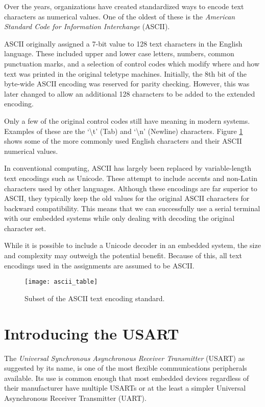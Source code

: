\documentclass[11pt,fleqn]{book} %
\begin{document}
Over the years, organizations have created standardized ways to encode text characters as numerical values. One of the oldest of these is the \textit{American Standard Code for Information Interchange} (ASCII). 

ASCII originally assigned a 7-bit value to 128 text characters in the English language. These included upper and lower case letters, numbers, common punctuation marks, and a selection of control codes which modify where and how text was printed in the original teletype machines. Initially, the 8th bit of the byte-wide ASCII encoding was reserved for parity checking. However, this was later changed to allow an additional 128 characters to be added to the extended encoding. 

Only a few of the original control codes still have meaning in modern systems. Examples of these are the `\textbackslash{}t' (Tab) and `\textbackslash{}n' (Newline) characters. Figure \ref{ascii_table} shows some of the more commonly used English characters and their ASCII numerical values.  

In conventional computing, ASCII has largely been replaced by variable-length text encodings such as Unicode. These attempt to include accents and non-Latin characters used by other languages. Although these encodings are far superior to ASCII, they typically keep the old values for the original ASCII characters for backward compatibility. This means that we can successfully use a serial terminal with our embedded systems while only dealing with decoding the original character set.

While it is possible to include a Unicode decoder in an embedded system, the size and complexity may outweigh the potential benefit. Because of this, all text encodings used in the assignments are assumed to be ASCII.

\begin{figure}[]
    \centering\texttt{[image: ascii\_table]}
    \caption{Subset of the ASCII text encoding standard.}
    \label{ascii_table}
\end{figure}


\section{Introducing the USART}
The \textit{Universal Synchronous Asynchronous Receiver Transmitter} (USART) as suggested by its name, is one of the most flexible communications peripherals available. Its use is common enough that most embedded devices regardless of their manufacturer have multiple USARTs or at the least a simpler Universal Asynchronous Receiver Transmitter (UART).
\end{document}
